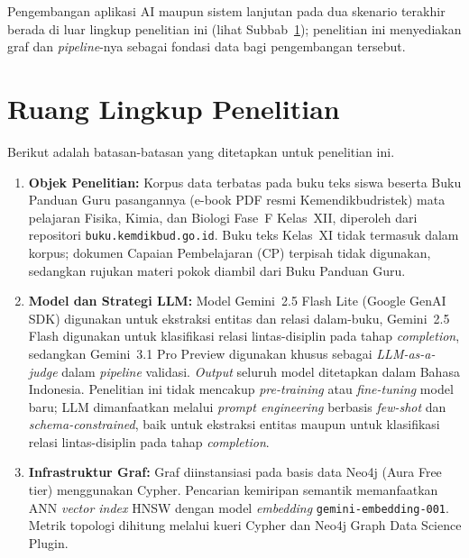 \documentclass[../../thesis]{subfiles}
\begin{document}
Pengembangan aplikasi AI maupun sistem lanjutan pada dua skenario terakhir berada
di luar lingkup penelitian ini (lihat Subbab~\ref{sec:ruang-lingkup}); penelitian
ini menyediakan graf dan \textit{pipeline}-nya sebagai fondasi data bagi
pengembangan tersebut.

\section{Ruang Lingkup Penelitian}
\label{sec:ruang-lingkup}

Berikut adalah batasan-batasan yang ditetapkan untuk penelitian ini.

\begin{enumerate}
  \item \textbf{Objek Penelitian:} Korpus data terbatas pada buku teks siswa
        beserta Buku Panduan Guru pasangannya (e-book PDF resmi
        Kemendikbudristek) mata pelajaran Fisika, Kimia, dan Biologi Fase~F
        Kelas~XII, diperoleh dari repositori \texttt{buku.kemdikbud.go.id}. Buku
        teks Kelas~XI tidak termasuk dalam korpus; dokumen Capaian Pembelajaran
        (CP) terpisah tidak digunakan, sedangkan rujukan materi pokok diambil
        dari Buku Panduan Guru.

  \item \textbf{Model dan Strategi LLM:} Model Gemini~2.5 Flash Lite
        (Google GenAI SDK) digunakan untuk ekstraksi entitas dan relasi
        dalam-buku, Gemini~2.5 Flash digunakan untuk klasifikasi relasi
        lintas-disiplin pada tahap \textit{completion}, sedangkan
        Gemini~3.1 Pro Preview digunakan khusus sebagai \textit{LLM-as-a-judge}
        dalam \textit{pipeline} validasi.
        \textit{Output} seluruh model ditetapkan dalam Bahasa Indonesia.
        Penelitian ini tidak mencakup \textit{pre-training} atau
        \textit{fine-tuning} model baru; LLM dimanfaatkan melalui
        \textit{prompt engineering} berbasis \textit{few-shot} dan
        \textit{schema-constrained}, baik untuk ekstraksi entitas maupun untuk
        klasifikasi relasi lintas-disiplin pada tahap \textit{completion}.

  \item \textbf{Infrastruktur Graf:} Graf diinstansiasi pada basis data Neo4j
        (Aura Free tier) menggunakan Cypher. Pencarian kemiripan semantik
        memanfaatkan ANN \textit{vector index} HNSW dengan model
        \textit{embedding} \texttt{gemini-embedding-001}. Metrik topologi
        dihitung melalui kueri Cypher dan Neo4j Graph Data Science Plugin.


\end{enumerate}
\end{document}
